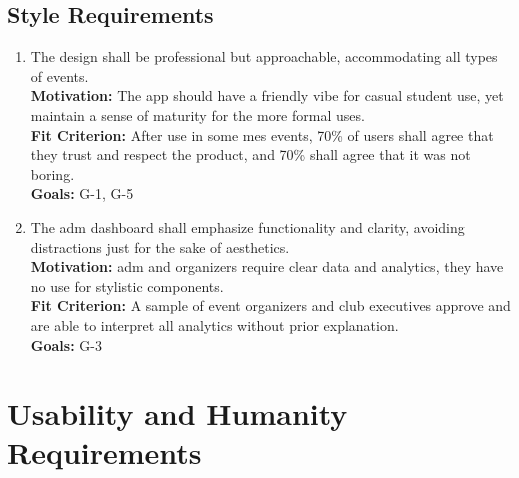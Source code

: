 \documentclass[12pt]{article}
\begin{document}
\subsection{Style Requirements}
\begin{enumerate}[label=\bfseries SR-\arabic*:, wide=0pt, leftmargin=*, 
  ref=\bfseries SR-\arabic*]
  \item \label{SR1} The design shall be professional but approachable, accommodating all types of events.\\[2mm]
    {\bf Motivation:} The app should have a friendly vibe for casual student use, yet maintain a sense of maturity for the more formal uses.\\
    {\bf Fit Criterion:} After use in some \Gls{mes} events, 70\% of users shall agree that they trust and respect the product, and 70\% shall agree that it was not boring.\\
    {\bf Goals:} G-1, G-5
  \item \label{SR2} The \gls{adm} dashboard shall emphasize functionality and clarity, avoiding distractions just for the sake of aesthetics.\\[2mm]
    {\bf Motivation:} \Gls{adm} and organizers require clear data and analytics, they have no use for stylistic components.\\
    {\bf Fit Criterion:} A sample of event organizers and club executives approve and are able to interpret all analytics without prior explanation.\\
    {\bf Goals:} G-3
\end{enumerate}

\section{Usability and Humanity Requirements}
\end{document}
